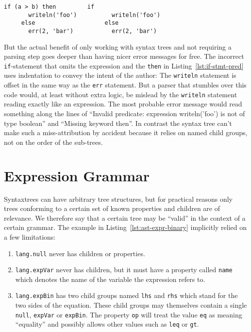 \documentclass[sigconf,natbib=false]{acmart}
\newcommand{\enquote}[1]{``#1''}
\begin{document}
\begin{lstlisting}[caption={\texttt{if}-Statement with and without predicate}, label=lst:if-stmt-pred]
     if (a > b) then         if
       writeln('foo')          writeln('foo')
     else                    else
       err(2, 'bar')           err(2, 'bar')
\end{lstlisting}

But the actual benefit of only working with syntax trees and not requiring a parsing step goes deeper than having nicer error messages for free. The incorrect \texttt{if}-statement that omits the expression and the \texttt{then} in Listing~\ref{lst:if-stmt-pred} uses indentation to convey the intent of the author: The \texttt{writeln} statement is offset in the same way as the \texttt{err} statement. But a parser that stumbles over this code would, at least without extra logic, be mislead by the \texttt{writeln} statement reading exactly like an expression. The most probable error message would read something along the lines of \enquote{Invalid predicate: expression writeln('foo') is not of type boolean} and \enquote{Missing keyword then}. In contrast the syntax tree can't make such a miss-attribution by accident because it relies on named child groups, not on the order of the sub-trees.

\section{Expression Grammar}
\label{sec:expression-grammar}

Syntaxtrees can have arbitrary tree structures, but for practical reasons only trees conforming to a certain set of known properties and children are of relevance. We therefore say that a certain tree may be \enquote{valid} in the context of a certain grammar. The example in Listing~\ref{lst:ast-expr-binary} implicitly relied on a few limitations:

\begin{enumerate}
\item \label{itm:lang-exp-null} \texttt{lang.null} never has children or properties.

\item \label{itm:lang-exp-var} \texttt{lang.expVar} never has children, but it must have a property called \texttt{name} which denotes the name of the variable the expression refers to.

\item \label{itm:lang-exp-bin} \texttt{lang.expBin} has two child groups named \texttt{lhs} and \texttt{rhs} which stand for the two sides of the equation. These child groups may themselves contain a single \texttt{null}, \texttt{expVar} or \texttt{expBin}. The property \texttt{op} will treat the value \texttt{eq} as meaning \enquote{equality} and possibly allows other values such as \texttt{leq} or \texttt{gt}.
\end{enumerate}
\end{document}

